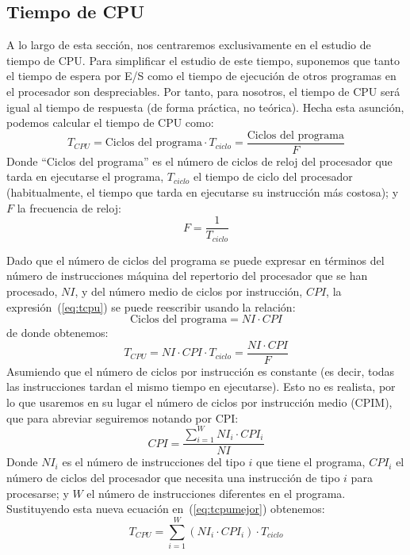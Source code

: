\subsection{Tiempo de CPU}
A lo largo de esta sección, nos centraremos exclusivamente en el estudio de tiempo de CPU\@. Para simplificar el estudio de este tiempo, suponemos que tanto el tiempo de espera por E/S como el tiempo de ejecución de otros programas en el procesador son despreciables. Por tanto, para nosotros, el tiempo de CPU será igual al tiempo de respuesta (de forma práctica, no teórica). Hecha esta asunción, podemos calcular el tiempo de CPU como:
\begin{equation}
    T_{CPU} = \text{Ciclos del programa} \cdot T_{ciclo} = \dfrac{\text{Ciclos del programa}}{F}
    \label{eq:tcpu}
\end{equation}
Donde ``Ciclos del programa'' es el número de ciclos de reloj del procesador que tarda en ejecutarse el programa, $T_{ciclo}$ el tiempo de ciclo del procesador (habitualmente, el tiempo que tarda en ejecutarse su instrucción más costosa); y $F$ la frecuencia de reloj:
\begin{equation}
    F = \dfrac{1}{T_{ciclo}}
\end{equation}

Dado que el número de ciclos del programa se puede expresar en términos del número de instrucciones máquina del repertorio del procesador que se han procesado, $NI$, y del número medio de ciclos por instrucción, $CPI$, la expresión~(\ref{eq:tcpu}) se puede reescribir usando la relación:
\begin{equation}
    \text{Ciclos del programa} = NI\cdot CPI
\end{equation}
de donde obtenemos:
\begin{equation} \label{eq:tcpumejor}
    T_{CPU} = NI \cdot CPI \cdot T_{ciclo} = \dfrac{NI \cdot CPI}{F}
\end{equation}
Asumiendo que el número de ciclos por instrucción es constante (es decir, todas las instrucciones tardan el mismo tiempo en ejecutarse). Esto no es realista, por lo que usaremos en su lugar el número de ciclos por instrucción medio (CPIM), que para abreviar seguiremos notando por CPI:
\begin{equation}
    CPI = \dfrac{\sum_{i=1}^W NI_i \cdot CPI_i}{NI}
\end{equation}
Donde $NI_i$ es el número de instrucciones del tipo $i$ que tiene el programa, $CPI_i$ el número de ciclos del procesador que necesita una instrucción de tipo $i$ para procesarse; y $W$ el número de instrucciones diferentes en el programa. Sustituyendo esta nueva ecuación en~(\ref{eq:tcpumejor}) obtenemos:
\begin{equation}
    T_{CPU} = \sum_{i=1}^W \left(NI_i \cdot CPI_i \right) \cdot T_{ciclo}
\end{equation}

